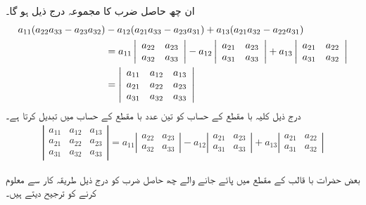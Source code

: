 ان چھ حاصل ضرب کا مجموعہ درج  ذیل ہو گا۔
\begin{align}
a_{11}(a_{22}a_{33}-a_{23}a_{32})&-a_{12}(a_{21}a_{33}-a_{23}a_{31})+a_{13}(a_{21}a_{32}-a_{22}a_{31})\notag\\
&=a_{11}
\left|
\begin{array}{ll}
a_{22}&a_{23}\\
a_{32}&a_{33}
\end{array}\right|
-a_{12}
\left|
\begin{array}{ll}
a_{21}&a_{23}\\
a_{31}&a_{33}
\end{array}\right|
+a_{13}
\left|
\begin{array}{ll}
a_{21}&a_{22}\\
a_{31}&a_{32}
\end{array}\right| \notag\\
&=
\left|
\begin{array}{lll}
a_{11}& a_{12}&a_{13}\\
a_{21}& a_{22}&a_{23}\\
a_{31}& a_{32}&a_{33}
\end{array}\right|
\end{align}
درج ذیل کلیہ   با  مقطع کے حساب کو تین عدد  با  مقطع کے حساب میں تبدیل کرتا ہے۔
\begin{align}\label{مساوات_ضمیمہ_قالب_مقطع_سادہ}
\left|
\begin{array}{lll}
a_{11}& a_{12}&a_{13}\\
a_{21}& a_{22}&a_{23}\\
a_{31}& a_{32}&a_{33}
\end{array}\right|=
a_{11}
\left|
\begin{array}{ll}
a_{22}&a_{23}\\
a_{32}&a_{33}
\end{array}\right|
-a_{12}
\left|
\begin{array}{ll}
a_{21}&a_{23}\\
a_{31}&a_{33}
\end{array}\right|
+a_{13}
\left|
\begin{array}{ll}
a_{21}&a_{22}\\
a_{31}&a_{32}
\end{array}\right|
\end{align}

بعض حضرات   با   قالب کے مقطع       میں پائے جانے والے چھ حاصل ضرب کو درج ذیل طریقہ کار سے معلوم کرنے   کو ترجیح دیتے ہیں۔


